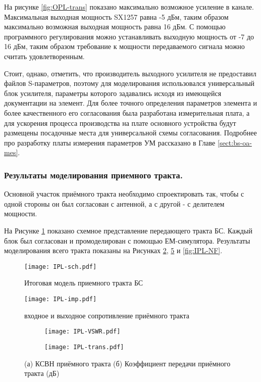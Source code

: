На рисунке \ref{fig:OPL-trans} показано максимально возможное усиление в канале. Максимальная выходная мощность SX1257 равна -5 дБм, таким образом максимально возможная выходная мощность равна 16 дБм. С помощью программного регулирования можно устанавливать выходную мощность от  -7 до 16 дБм, таким образом требование к мощности передаваемого сигнала можно считать удовлетворенным.

Стоит, однако, отметить, что производитель выходного усилителя не предоставил файлов S-параметров, поэтому для моделирования использовался универсальный блок усилителя, параметры которого задавались исходя из имеющейся документации на элемент. Для более точного определения параметров элемента и более качественного его согласования была разработана измерительная плата, а для ускорения процесса производства на плате основного устройства будут размещены посадочные места для универсальной схемы согласования. Подробнее про разработку платы измерения параметров УМ рассказано в Главе \ref{sect:bs-oa-mes}.

\subsubsection{Результаты моделирования приемного тракта.}
Основной участок приёмного тракта необходимо спроектировать так, чтобы с одной стороны он был согласован с антенной, а с другой - с делителем мощности.

На Рисунке \ref{fig:IPL-sch} показано схемное представление передающего тракта БС. Каждый блок был согласован и промоделирован с помощью ЕМ-симулятора. Результаты моделирования всего тракта показаны на Рисунках \ref{fig:IPL-imp}, \ref{fig:IPL-VSWR-trans} и \ref{fig:IPL-NF}.

\begin{figure}[H]
	\centering
	\texttt{[image: IPL-sch.pdf]}
	\caption{Итоговая модель приемного тракта БС}%
	\label{fig:IPL-sch}
\end{figure}

\begin{figure}[H]
	\centering
	\texttt{[image: IPL-imp.pdf]}
	\caption{входное и выходное сопротивление приёмного тракта}%
	\label{fig:IPL-imp}
\end{figure}

\begin{figure}[H]
	\centering
	\begin{subfigure}[b]{0.49\textwidth}
		\centering
		\texttt{[image: IPL-VSWR.pdf]}
		\caption{}%
		\label{fig:IPL-VSWR}
	\end{subfigure}
	\hfill
	\begin{subfigure}[b]{0.49\textwidth}
		\centering
		\texttt{[image: IPL-trans.pdf]}
		\caption{}%
		\label{fig:IPL-trans}
	\end{subfigure}
	\caption{%
		(а) КСВН приёмного тракта
		(б) Коэффициент передачи приёмного тракта (дБ)
	}%
	\label{fig:IPL-VSWR-trans}
\end{figure}

